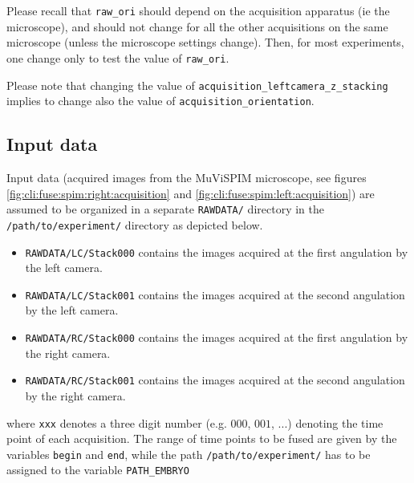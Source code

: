 Please recall that \texttt{raw\_ori} should depend on the acquisition apparatus (ie the microscope), and should not change for all the other acquisitions on the same microscope (unless the microscope settings change). Then, for most experiments, one change only to test the value of 
\texttt{raw\_ori}.

Please note that changing the value of \texttt{acquisition\_leftcamera\_z\_stacking} implies to change also the value of \texttt{acquisition\_orientation}.




\subsection{Input data}
\label{sec:cli:fuse:input:data}



Input data (acquired images from the MuViSPIM microscope, see figures \ref{fig:cli:fuse:spim:right:acquisition} and \ref{fig:cli:fuse:spim:left:acquisition}) are assumed
to be organized in a separate \texttt{RAWDATA/} directory in the 
\texttt{/path/to/experiment/} directory as depicted below. 
\begin{itemize}
  \itemsep -0.5ex
\item \texttt{RAWDATA/LC/Stack000} contains the images acquired at the
  first angulation by the left camera.
\item \texttt{RAWDATA/LC/Stack001} contains the images acquired at the
  second angulation by the left camera.
\item \texttt{RAWDATA/RC/Stack000} contains the images acquired at the
  first angulation by the right camera.
\item \texttt{RAWDATA/RC/Stack001} contains the images acquired at the
  second angulation by the right camera.
\end{itemize}

\mbox{}
\mbox{}

where \texttt{xxx} denotes a three digit number (e.g. $000$, $001$,
...) denoting the time point of each acquisition. The range of time
points to be fused are given by the variables \texttt{begin} and
\texttt{end}, while the path \texttt{/path/to/experiment/} has to be
assigned to the variable \texttt{PATH\_EMBRYO} 

